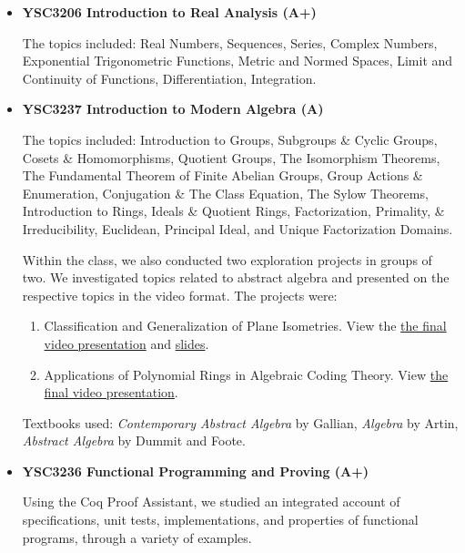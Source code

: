 \documentclass[11pt,reqno,oneside,a4paper]{article}
\begin{document}
\begin{itemize}
		\item \textbf{YSC3206 Introduction to Real Analysis (A+)}
		
		\par The topics included: Real Numbers, Sequences, Series, Complex Numbers, Exponential  Trigonometric Functions, Metric and Normed Spaces, Limit and Continuity of Functions, Differentiation, Integration.
		
		\item \textbf{YSC3237 Introduction to Modern Algebra (A)}
		
		\par The topics included:	Introduction to Groups, Subgroups \& Cyclic Groups, Cosets \& Homomorphisms, Quotient Groups,		The Isomorphism Theorems,		The Fundamental Theorem of Finite Abelian Groups,		Group Actions \& Enumeration, Conjugation \& The Class Equation,		The Sylow Theorems, Introduction to Rings,		Ideals \& Quotient Rings, Factorization, Primality, \& Irreducibility,		Euclidean, Principal Ideal, and Unique Factorization Domains.
		
		\par Within the class, we also conducted two exploration projects in groups of two. We investigated topics related to abstract algebra and presented on the respective topics in the video format. The projects were:
		
		\begin{enumerate}
			\item Classification and Generalization of Plane Isometries. View the \href{https://youtu.be/63exo4bGD7k}{the final video presentation} and \href{https://github.com/zhangliu6/course-submissions/blob/main/Modern_Algebra_Exploration_1%20(1).pdf}{slides}.
			\item Applications of Polynomial Rings in Algebraic Coding Theory. View \href{https://youtu.be/_XOCvLLPfVQ}{the final video presentation}.
		\end{enumerate}
		
		\par Textbooks used: \textit{Contemporary Abstract Algebra} by Gallian, \textit{Algebra} by Artin, \textit{Abstract Algebra} by Dummit and Foote.  
		
		\item \textbf{YSC3236 Functional Programming and Proving (A+)}
		
		\par Using the Coq Proof Assistant, we studied an integrated account of specifications, unit tests, implementations, and properties of functional programs, through a variety of examples.
		

\end{itemize}
\end{document}
